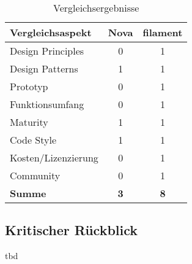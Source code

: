 \begin{table}[]
    \centering
    \caption{Vergleichsergebnisse}
    \label{tab:vergleichsergebnisse}
    \begin{tabular}{|l|c|c|}
        \hline
        \textbf{Vergleichsaspekt} & \textbf{Nova} & \textbf{filament} \\ \hline
        Design Principles         & 0             & 1                 \\ \hline
        Design Patterns           & 1             & 1                 \\ \hline
        Prototyp                  & 0             & 1                 \\ \hline
        Funktionsumfang           & 0             & 1                 \\ \hline
        Maturity                  & 1             & 1                 \\ \hline
        Code Style                & 1             & 1                 \\ \hline
        Kosten/Lizenzierung       & 0             & 1                 \\ \hline
        Community                 & 0             & 1                 \\ \hline
        \textbf{Summe}            & \textbf{3}    & \textbf{8}        \\ \hline
    \end{tabular}
\end{table}

\subsection{Kritischer Rückblick}
\color{red}
tbd
\color{black}

